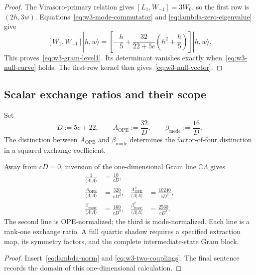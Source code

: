\begin{proof}
The Virasoro-primary relation gives
$[L_1,W_{-1}]=3W_0$, so the first row is $(2h,3w)$.
Equations~\eqref{eq:w3-mode-commutator} and
\eqref{eq:lambda-zero-eigenvalue} give
\[
[W_1,W_{-1}]|h,w\rangle
=\left[-\frac h5+
\frac{32}{22+5c}\left(h^2+\frac h5\right)\right]|h,w\rangle.
\]
This proves~\eqref{eq:w3-gram-level1}.  Its determinant vanishes
exactly when~\eqref{eq:w3-null-curve} holds.  The first-row kernel
then gives~\eqref{eq:w3-null-vector}.
\end{proof}

\subsection{Scalar exchange ratios and their scope}

Set
\begin{equation}\label{eq:w3-two-couplings}
D:=5c+22,
\qquad
A_{\mathrm{OPE}}:=\frac{32}{D},
\qquad
\beta_{\mathrm{mode}}:=\frac{16}{D}.
\end{equation}
The distinction between $A_{\mathrm{OPE}}$ and
$\beta_{\mathrm{mode}}$ determines the factor-of-four distinction in
a squared exchange coefficient.

\begin{proposition}
\label{prop:w3-lambda-exchange-ratios}
Away from $cD=0$, inversion of the one-dimensional Gram line
$\mathbb C\Lambda$ gives
\begin{align}
\frac{1}{\langle\Lambda|\Lambda\rangle}
&=\frac{10}{cD},\label{eq:lambda-inverse-norm}\\
\frac{A_{\mathrm{OPE}}}{\langle\Lambda|\Lambda\rangle}
&=\frac{320}{cD^2},&
\frac{A_{\mathrm{OPE}}^2}{\langle\Lambda|\Lambda\rangle}
&=\frac{10240}{cD^3},\label{eq:lambda-ope-ratios}\\
\frac{\beta_{\mathrm{mode}}}{\langle\Lambda|\Lambda\rangle}
&=\frac{160}{cD^2},&
\frac{\beta_{\mathrm{mode}}^2}{\langle\Lambda|\Lambda\rangle}
&=\frac{2560}{cD^3}.
\label{eq:lambda-mode-ratios}
\end{align}
The second line is OPE-normalized; the third is mode-normalized.
Each line is a rank-one exchange ratio.  A full quartic shadow
requires a specified extraction map, its symmetry factors, and the
complete intermediate-state Gram block.
\end{proposition}

\begin{proof}
Insert~\eqref{eq:lambda-norm} and
\eqref{eq:w3-two-couplings}.  The final sentence records the domain
of this one-dimensional calculation.
\end{proof}

